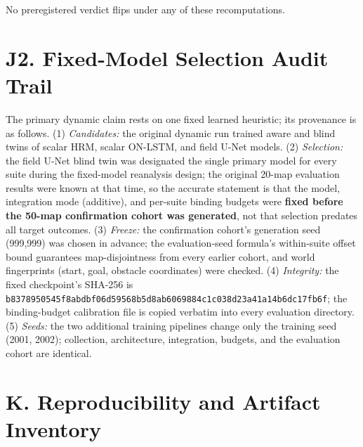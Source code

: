 \documentclass[letterpaper]{article} %
\begin{document}
No preregistered verdict flips under any of these recomputations.

\section{J2. Fixed-Model Selection Audit Trail}

The primary dynamic claim rests on one fixed learned heuristic; its provenance is as follows. (1) \emph{Candidates:} the original dynamic run trained aware and blind twins of scalar HRM, scalar ON-LSTM, and field U-Net models. (2) \emph{Selection:} the field U-Net blind twin was designated the single primary model for every suite during the fixed-model reanalysis design; the original 20-map evaluation results were known at that time, so the accurate statement is that the model, integration mode (additive), and per-suite binding budgets were \textbf{fixed before the 50-map confirmation cohort was generated}, not that selection predates all target outcomes. (3) \emph{Freeze:} the confirmation cohort's generation seed (999{,}999) was chosen in advance; the evaluation-seed formula's within-suite offset bound guarantees map-disjointness from every earlier cohort, and world fingerprints (start, goal, obstacle coordinates) were checked. (4) \emph{Integrity:} the fixed checkpoint's SHA-256 is \texttt{b8378950545f8abd\allowbreak bf06d59568b5d8ab\allowbreak 6069884c1c038d23\allowbreak a41a14b6dc17fb6f}; the binding-budget calibration file is copied verbatim into every evaluation directory. (5) \emph{Seeds:} the two additional training pipelines change only the training seed (2001, 2002); collection, architecture, integration, budgets, and the evaluation cohort are identical.

\section{K. Reproducibility and Artifact Inventory}
\end{document}
